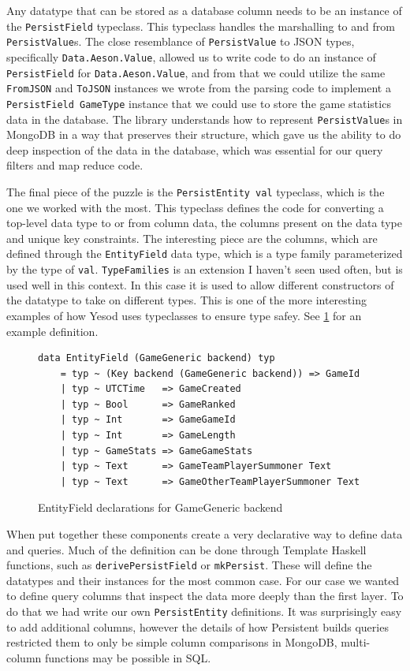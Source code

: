 \documentclass{chi2009}
\newcommand{\code}[1]{\texttt{#1}}
\begin{document}
Any datatype that can be stored as a database column needs to be an instance of the \code{PersistField} typeclass.  This typeclass handles the marshalling to and from \code{PersistValue}s.  The close resemblance of \code{PersistValue} to JSON types, specifically \code{Data.Aeson.Value}, allowed us to write code to do an instance of \code{PersistField} for \code{Data.Aeson.Value}, and from that we could utilize the same \code{FromJSON} and \code{ToJSON} instances we wrote from the parsing code to implement a \code{PersistField GameType} instance that we could use to store the game statistics data in the database.  The library understands how to represent \code{PersistValue}s in MongoDB in a way that preserves their structure, which gave us the ability to do deep inspection of the data in the database, which was essential for our query filters and map reduce code.

The final piece of the puzzle is the \code{PersistEntity val} typeclass, which is the one we worked with the most.  This typeclass defines the code for converting a top-level data type to or from column data, the columns present on the data type and unique key constraints.  The interesting piece are the columns, which are defined through the \code{EntityField} data type, which is a type family parameterized by the type of \code{val}.  \code{TypeFamilies} is an extension I haven't seen used often, but is used well in this context.  In this case it is used to allow different constructors of the datatype to take on different types.  This is one of the more interesting examples of how Yesod uses typeclasses to ensure type safey.  See \ref{EntityField} for an example definition.

\begin{figure}[]
\begin{verbatim}
data EntityField (GameGeneric backend) typ
    = typ ~ (Key backend (GameGeneric backend)) => GameId 
    | typ ~ UTCTime   => GameCreated
    | typ ~ Bool      => GameRanked
    | typ ~ Int       => GameGameId
    | typ ~ Int       => GameLength
    | typ ~ GameStats => GameGameStats
    | typ ~ Text      => GameTeamPlayerSummoner Text
    | typ ~ Text      => GameOtherTeamPlayerSummoner Text
\end{verbatim}
    \caption{EntityField declarations for GameGeneric backend}
    \label{EntityField}
\end{figure}

When put together these components create a very declarative way to define data and queries.  Much of the definition can be done through Template Haskell functions, such as \code{derivePersistField} or \code{mkPersist}.  These will define the datatypes and their instances for the most common case.  For our case we wanted to define query columns that inspect the data more deeply than the first layer.  To do that we had write our own \code{PersistEntity} definitions.  It was surprisingly easy to add additional columns, however the details of how Persistent builds queries restricted them to only be simple column comparisons in MongoDB, multi-column functions may be possible in SQL.
\end{document}
